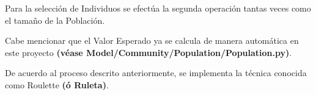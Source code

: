 \documentclass[letterpaper,10pt,english]{sphinxmanual}
\begin{document}
\begin{DUlineblock}{0em}
\item[] Para la selección de Individuos se efectúa la segunda operación tantas veces como el tamaño de la Población.
\item[] Cabe mencionar que el Valor Esperado ya se calcula de manera automática en este proyecto \textbf{(véase Model/Community/Population/Population.py)}.
\end{DUlineblock}
\label{Model/Operator/Selection/Roulette:module-Model.Operator.Selection.Roulette}

\begin{fulllineitems}
\label{Model/Operator/Selection/Roulette:Model.Operator.Selection.Roulette.execute_selection_technique}
De acuerdo al proceso descrito anteriormente, se implementa
la técnica conocida como Roulette \textbf{(ó Ruleta)}.

\end{fulllineitems}
\end{document}
